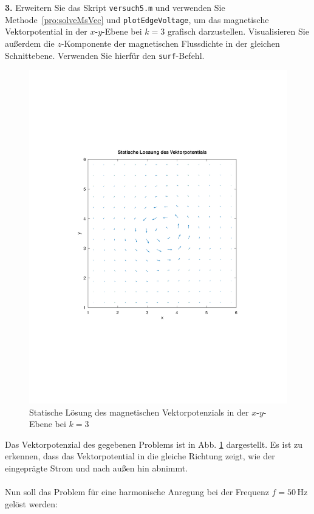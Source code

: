 \documentclass[Protokollheft.tex]{subfiles}
\begin{document}
        \begin{framed}
	\noindent \textbf{3.} Erweitern Sie das Skript \lstinline{versuch5.m} und verwenden Sie Methode~\eqref{pro:solveMsVec} und \lstinline{plotEdgeVoltage}, um das magnetische Vektorpotential in der $x$-$y$-Ebene bei $k=3$ grafisch darzustellen. Visualisieren Sie außerdem die $z$-Komponente der magnetischen Flussdichte in der gleichen Schnittebene. Verwenden Sie hierfür den \lstinline{surf}-Befehl.\label{exer:visualizeMagVecPot}
\end{framed}
\begin{figure}
	\centering
	\includegraphics[trim = 15mm 65mm 15mm 65mm, clip,width=0.7\linewidth]{StatischeLoesungdesVektorpotenzials.pdf}
	\caption{Statische Lösung des magnetischen Vektorpotenzials in der $x$-$y$-Ebene bei $k=3$}
	\label{fig:statischeloesungdesvektorpotenzials}
\end{figure}
\noindent
Das Vektorpotenzial des gegebenen Problems ist in Abb. \ref{fig:statischeloesungdesvektorpotenzials} dargestellt. Es ist zu erkennen, dass das Vektorpotential in die gleiche Richtung zeigt, wie der eingeprägte Strom und nach außen hin abnimmt. 
\\
\\
%
Nun soll das Problem für eine harmonische Anregung bei der
Frequenz $f=50\,\text{Hz}$ gelöst werden:
%
\end{document}
